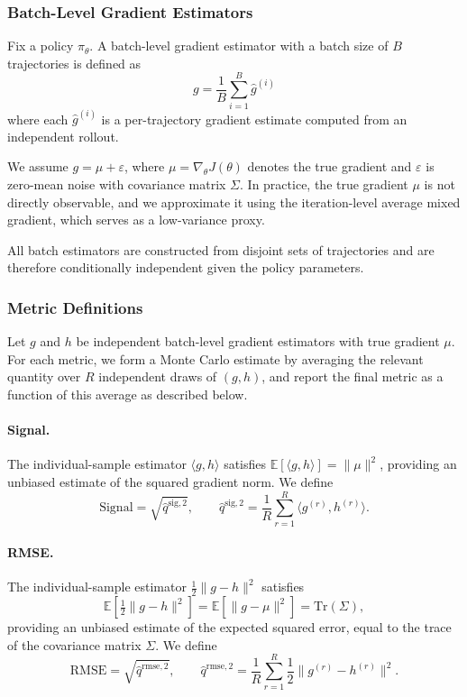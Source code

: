 \documentclass{article}
\theoremstyle{definition}
\theoremstyle{remark}
\begin{document}
\subsubsection{Batch-Level Gradient Estimators}

Fix a policy $\pi_\theta$. A batch-level gradient estimator with a batch size of $B$ trajectories is defined as
\[
g = \frac{1}{B} \sum_{i=1}^B \hat{g}^{(i)}
\]
where each $\hat{g}^{(i)}$ is a per-trajectory gradient estimate computed from an independent rollout.

We assume $g = \mu + \varepsilon$, where $\mu = \nabla_\theta J(\theta)$ denotes the true gradient and $\varepsilon$ is zero-mean noise with covariance matrix $\Sigma$. In practice, the true gradient $\mu$ is not directly observable, and we approximate it using the iteration-level average mixed gradient, which serves as a low-variance proxy.

All batch estimators are constructed from disjoint sets of trajectories and are therefore conditionally independent given the policy parameters.

\subsubsection{Metric Definitions}

Let $g$ and $h$ be independent batch-level gradient estimators with true gradient $\mu$. For each
metric, we form a Monte Carlo estimate by averaging the relevant quantity over $R$ independent
draws of $(g, h)$, and report the final metric as a function of this average as described below.

\paragraph{Signal.}
The individual-sample estimator $\langle g, h \rangle$ satisfies
$\mathbb{E}[\langle g, h \rangle] = \|\mu\|^2$,
providing an unbiased estimate of the squared gradient norm. We define
\[
    \text{Signal} = \sqrt{\hat{q}^{\mathrm{sig},2}}, \qquad
    \hat{q}^{\mathrm{sig},2} = \frac{1}{R}\sum_{r=1}^R \langle g^{(r)}, h^{(r)} \rangle.
\]

\paragraph{RMSE.}
The individual-sample estimator $\frac{1}{2}\|g - h\|^2$ satisfies
\[
    \mathbb{E}\!\left[\tfrac{1}{2}\|g - h\|^2\right]
    = \mathbb{E}\!\left[\|g - \mu\|^2\right]
    = \mathrm{Tr}(\Sigma),
\]
providing an unbiased estimate of the expected squared error, equal to the trace of the covariance
matrix $\Sigma$. We define
\[
    \text{RMSE} = \sqrt{\hat{q}^{\mathrm{rmse},2}}, \qquad
    \hat{q}^{\mathrm{rmse},2} = \frac{1}{R}\sum_{r=1}^R \frac{1}{2}\|g^{(r)} - h^{(r)}\|^2.
\]
\end{document}
